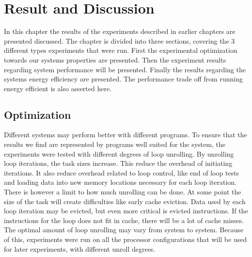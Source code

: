 \chapter[Result and Discussion]{Result and Discussion}
In this chapter the results of the experiments described in earlier chapters are presented discussed.
The chapter is divided into three sections, covering the 3 different types experiments that were run.
First the experimental optimization towards our systems properties are presented.
Then the experiment results regarding system performance will be presented.
Finally the results regarding the systems energy efficiency are presented.
The performance trade off from running energy efficient is also asserted here.

\section{Optimization}
Different systems may perform better with different programs.
To ensure that the results we find are represented by programs well suited for the system, the experiments were tested with different degrees of loop unrolling.
By unrolling loop iterations, the task sizes increase.
This reduce the overhead of initiating iterations.
It also reduce overhead related to loop control, like end of loop tests and loading data into new memory locations necessary for each loop iteration.
There is however a limit to how much unrolling can be done.
At some point the size of the task will create difficulties like early cache eviction.
Data used by each loop iteration may be evicted, but even more critical is evicted instructions.
If the instructions for the loop does not fit in cache, there will be a lot of cache misses.
The optimal amount of loop unrolling may vary from system to system.
Because of this, experiments were run on all the processor configurations that will be used for later experiments, with different unroll degrees.

